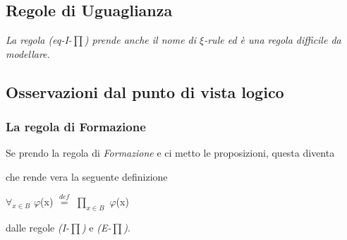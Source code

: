 \subsection{Regole di Uguaglianza}
\label{subsec: uguaglianza-prodottop-dip}
\begin{prooftree}
\end{prooftree}

\begin{prooftree}
\end{prooftree}
\textit{La regola (eq-I-{\scriptsize$\prod$}) prende anche il nome di $\xi$-rule ed \`e una regola difficile da modellare.}

\begin{prooftree}
\end{prooftree}
\normalsize

\subsection{Osservazioni dal punto di vista logico}
\label{subsec:osservazioni-dal-punto-di-vista-logico-prodotto-dip}

\subsubsection{La regola di Formazione}
\label{subsubsec:osservazioni-formazione-prodotto-dip}
Se prendo la regola di \textit{Formazione} e ci metto le proposizioni, questa diventa
\begin{prooftree}
\end{prooftree}
\noindent
che rende vera la seguente definizione
\begin{center}$\forall_{x \in B}$ $\varphi$(x) ${\overset{\mathit{def}}{=}}$ $\prod\limits_{x \in B}$ $\varphi$(x)\end{center}
dalle regole \textit{(I-{\scriptsize$\prod$})} e \textit{(E-{\scriptsize$\prod$})}.\\
